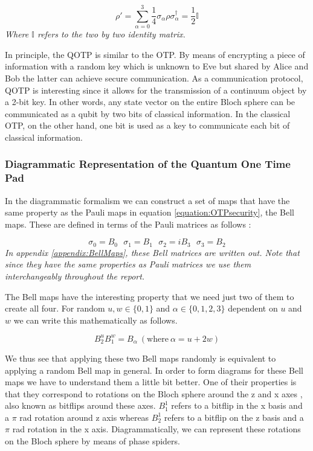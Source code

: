\documentclass[]{article}
\begin{document}
\begin{equation}
	\label{equation:OTPsecurity}
	\rho' = \sum\limits_{\alpha = 0}^3 \frac{1}{4} \sigma_\alpha \rho \sigma_\alpha^\dagger = \frac{1}{2}\mathbb{I}
\end{equation}
\textit{Where $\mathbb{I}$ refers to the two by two identity matrix.}

In principle, the QOTP is similar to the OTP. By means of encrypting a piece of information with a random key which is unknown to Eve but shared by Alice and Bob the latter can achieve secure communication. As a communication protocol, QOTP is interesting since it allows for the transmission of a continuum object by a 2-bit key. In other words, any state vector on the entire Bloch sphere can be communicated as a qubit by two bits of classical information. In the classical OTP, on the other hand, one bit is used as a key to communicate each bit of classical information.

\subsubsection{Diagrammatic Representation of the Quantum One Time Pad}
\label{DiagramRepresentationQOTP}
In the diagrammatic formalism we can construct a set of maps that have the same property as the Pauli maps in equation \ref{equation:OTPsecurity}, the Bell maps. These are defined in terms of the Pauli matrices as follows \cite{Coecke2017}:

\begin{equation}
\label{equation:bellsigmas}
	\sigma_0 = B_0 ~~~ \sigma_1 = B_1 ~~~ \sigma_2 = iB_3 ~~~ \sigma_3 = B_2 
\end{equation}
\textit{In appendix \ref{appendix:BellMaps}, these Bell matrices are written out. Note that since they have the same properties as Pauli matrices we use them interchangeably throughout the report.}

The Bell maps have the interesting property that we need just two of them to create all four. For random $u, w \in \{0,1\}$ and $\alpha \in \{0,1,2,3\}$ dependent on $u$ and $w$ we can write this mathematically as follows.

\begin{equation}
\label{randombell}
	B_2^uB_1^w = B_\alpha ~(\text{where}\ \alpha = u + 2w)
\end{equation}

We thus see that applying these two Bell maps randomly is equivalent to applying a random Bell map in general. In order to form diagrams for these Bell maps we have to understand them a little bit better. One of their properties is that they correspond to rotations on the Bloch sphere around the z and x axes \cite{DJORDJEVIC2012227}, also known as bitflips around these axes. $B_1^1$ refers to a bitflip in the x basis and a $\pi$ rad rotation around z axis whereas $B_2^1$ refers to a bitflip on the z basis and a $\pi$ rad rotation in the x axis. Diagrammatically, we can represent these rotations on the Bloch sphere by means of phase spiders.
\end{document}
